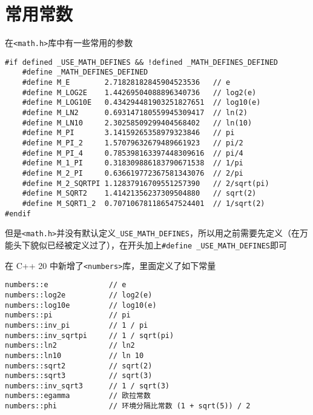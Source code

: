 \section{常用常数}
在\verb|<math.h>|库中有一些常用的参数
\begin{lstlisting}
#if defined _USE_MATH_DEFINES && !defined _MATH_DEFINES_DEFINED
    #define _MATH_DEFINES_DEFINED
    #define M_E        2.71828182845904523536   // e
    #define M_LOG2E    1.44269504088896340736   // log2(e)
    #define M_LOG10E   0.434294481903251827651  // log10(e)
    #define M_LN2      0.693147180559945309417  // ln(2)
    #define M_LN10     2.30258509299404568402   // ln(10)
    #define M_PI       3.14159265358979323846   // pi
    #define M_PI_2     1.57079632679489661923   // pi/2
    #define M_PI_4     0.785398163397448309616  // pi/4
    #define M_1_PI     0.318309886183790671538  // 1/pi
    #define M_2_PI     0.636619772367581343076  // 2/pi
    #define M_2_SQRTPI 1.12837916709551257390   // 2/sqrt(pi)
    #define M_SQRT2    1.41421356237309504880   // sqrt(2)
    #define M_SQRT1_2  0.707106781186547524401  // 1/sqrt(2)
#endif
\end{lstlisting}
但是\verb|<math.h>|并没有默认定义\verb|_USE_MATH_DEFINES|，所以用之前需要先定义（在万能头下貌似已经被定义过了），在开头加上\verb|#define _USE_MATH_DEFINES|即可


在 C++ 20 中新增了\verb|<numbers>|库，里面定义了如下常量

\begin{lstlisting}
numbers::e              // e
numbers::log2e          // log2(e)
numbers::log10e         // log10(e)
numbers::pi             // pi
numbers::inv_pi         // 1 / pi
numbers::inv_sqrtpi     // 1 / sqrt(pi)
numbers::ln2            // ln2
numbers::ln10           // ln 10
numbers::sqrt2          // sqrt(2)
numbers::sqrt3          // sqrt(3)
numbers::inv_sqrt3      // 1 / sqrt(3)
numbers::egamma         // 欧拉常数
numbers::phi            // 环境分隔比常数 (1 + sqrt(5)) / 2
\end{lstlisting}
